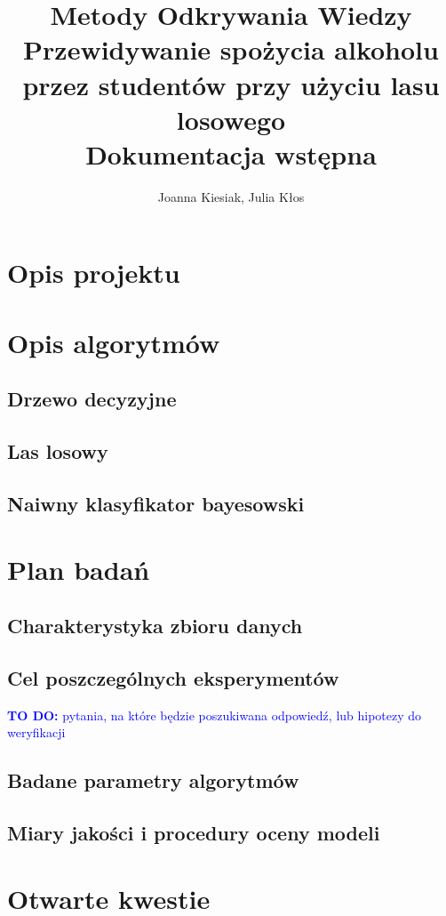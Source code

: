 \documentclass{article}
\title{{\normalfont Metody Odkrywania Wiedzy}\vspace{0.2cm} \\ 
Przewidywanie spożycia alkoholu przez studentów przy użyciu lasu losowego\\
\vspace{0.2cm}
\large{\normalfont Dokumentacja wstępna}}
\author{
Joanna Kiesiak, Julia Kłos\\

}
\newcommand{\todo}[1]{\textcolor{blue}{\textbf{TO DO:} #1}}
\begin{document}
\maketitle

\section{Opis projektu}

\section{Opis algorytmów}
\subsection{Drzewo decyzyjne}

\subsection{Las losowy}

\subsection{Naiwny klasyfikator bayesowski}

\section{Plan badań}
\subsection{Charakterystyka zbioru danych}

\subsection{Cel poszczególnych eksperymentów}
\todo{pytania, na które będzie poszukiwana odpowiedź, lub hipotezy do weryfikacji}
\subsection{Badane parametry algorytmów}
\subsection{Miary jakości i procedury oceny modeli}
\section{Otwarte kwestie}


\end{document}
